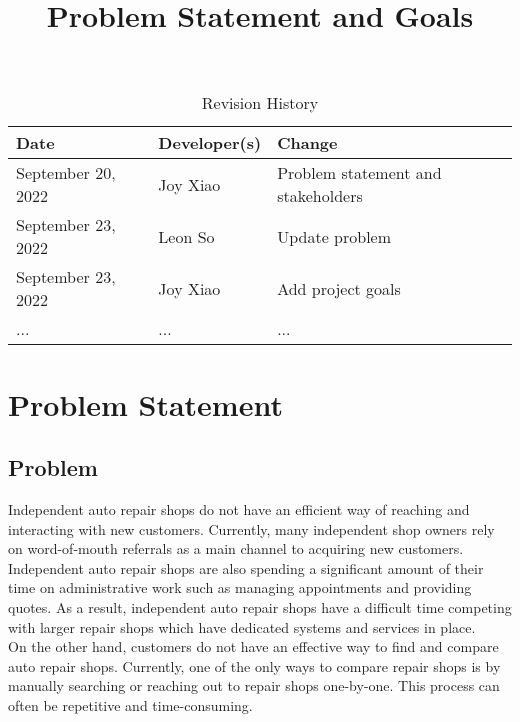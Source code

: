 \documentclass{article}
\title{Problem Statement and Goals\\\progname}
\author{\authname}
\date{}
\begin{document}
\maketitle

\begin{table}[hp]
\caption{Revision History} \label{TblRevisionHistory}
\begin{tabularx}{\textwidth}{llX}
\toprule
\textbf{Date} & \textbf{Developer(s)} & \textbf{Change}\\
\midrule
September 20, 2022 & Joy Xiao & Problem statement and stakeholders\\
September 23, 2022 & Leon So & Update problem\\
September 23, 2022 & Joy Xiao & Add project goals\\
... & ... & ...\\
\bottomrule
\end{tabularx}
\end{table}

\section{Problem Statement}


\subsection{Problem}
Independent auto repair shops do not have an efficient way of reaching and interacting with new customers.
Currently, many independent shop owners rely on word-of-mouth referrals as a main channel to acquiring new customers. 
Independent auto repair shops are also spending a significant amount of their time on administrative work such as 
managing appointments and providing quotes. As a result, independent auto repair shops have a difficult time 
competing with larger repair shops which have dedicated systems and services in place.\\

On the other hand, customers do not have an effective way to find and compare auto repair shops. 
Currently, one of the only ways to compare repair shops is by manually searching or reaching out to repair shops one-by-one. 
This process can often be repetitive and time-consuming.
\end{document}
